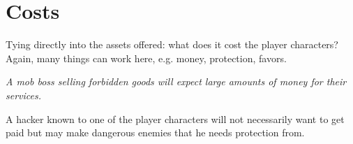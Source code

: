 \documentclass[12pt,a4paper,openany]{book}
\begin{document}
	\section*{Costs}
	Tying directly into the assets offered: what does it cost the player characters? Again, many things can work here, e.g. money, protection, favors.
	\begin{exampleblock}
		\itshape A mob boss selling forbidden goods will expect large amounts of money for their services.\par
		A hacker known to one of the player characters will not necessarily want to get paid but may make dangerous enemies that he needs protection from.
	\end{exampleblock}
\end{document}
